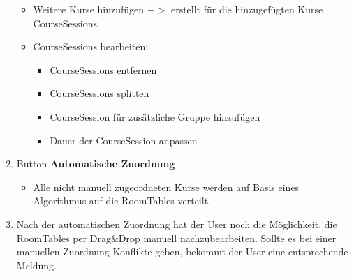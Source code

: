 \documentclass{article}
\begin{document}
\begin{enumerate}
\begin{itemize}
			\item Weitere Kurse hinzufügen $->$ erstellt für die hinzugefügten Kurse CourseSessions.
			\item CourseSessions bearbeiten:
			\begin{itemize}
				\item CourseSessions entfernen
				\item CourseSessions splitten
				\item CourseSession für zusätzliche Gruppe hinzufügen
				\item Dauer der CourseSession anpassen
			\end{itemize}
		\end{itemize}
		\item Button \textbf{Automatische Zuordnung}
		\begin{itemize}
			\item Alle nicht manuell zugeordneten Kurse werden auf Basis eines Algorithmus auf die RoomTables verteilt.
		\end{itemize}
		\item Nach der automatischen Zuordnung hat der User noch die Möglichkeit, die RoomTables per Drag\&Drop manuell nachzubearbeiten. Sollte es bei einer manuellen Zuordnung Konflikte geben, bekommt der User eine entsprechende Meldung.
	\end{enumerate}
\end{document}
